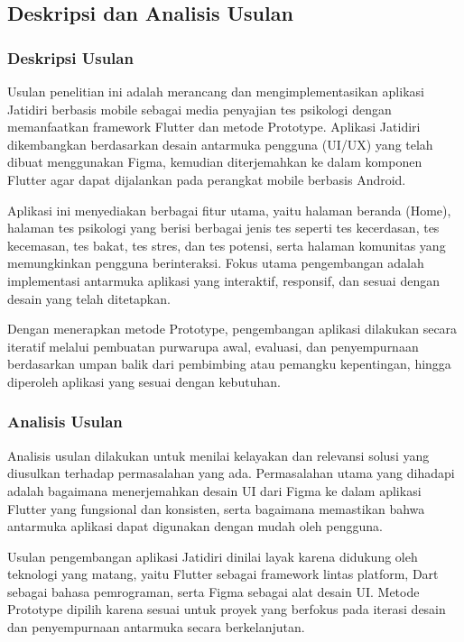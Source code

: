 \subsection{Deskripsi dan Analisis Usulan}

\subsubsection{Deskripsi Usulan}

Usulan penelitian ini adalah merancang dan mengimplementasikan aplikasi Jatidiri berbasis mobile sebagai media penyajian tes psikologi dengan memanfaatkan framework Flutter dan metode Prototype. Aplikasi Jatidiri dikembangkan berdasarkan desain antarmuka pengguna (UI/UX) yang telah dibuat menggunakan Figma, kemudian diterjemahkan ke dalam komponen Flutter agar dapat dijalankan pada perangkat mobile berbasis Android.

Aplikasi ini menyediakan berbagai fitur utama, yaitu halaman beranda (Home), halaman tes psikologi yang berisi berbagai jenis tes seperti tes kecerdasan, tes kecemasan, tes bakat, tes stres, dan tes potensi, serta halaman komunitas yang memungkinkan pengguna berinteraksi. Fokus utama pengembangan adalah implementasi antarmuka aplikasi yang interaktif, responsif, dan sesuai dengan desain yang telah ditetapkan.

Dengan menerapkan metode Prototype, pengembangan aplikasi dilakukan secara iteratif melalui pembuatan purwarupa awal, evaluasi, dan penyempurnaan berdasarkan umpan balik dari pembimbing atau pemangku kepentingan, hingga diperoleh aplikasi yang sesuai dengan kebutuhan.


\subsubsection{Analisis Usulan}

Analisis usulan dilakukan untuk menilai kelayakan dan relevansi solusi yang diusulkan terhadap permasalahan yang ada. Permasalahan utama yang dihadapi adalah bagaimana menerjemahkan desain UI dari Figma ke dalam aplikasi Flutter yang fungsional dan konsisten, serta bagaimana memastikan bahwa antarmuka aplikasi dapat digunakan dengan mudah oleh pengguna.

Usulan pengembangan aplikasi Jatidiri dinilai layak karena didukung oleh teknologi yang matang, yaitu Flutter sebagai framework lintas platform, Dart sebagai bahasa pemrograman, serta Figma sebagai alat desain UI. Metode Prototype dipilih karena sesuai untuk proyek yang berfokus pada iterasi desain dan penyempurnaan antarmuka secara berkelanjutan.

